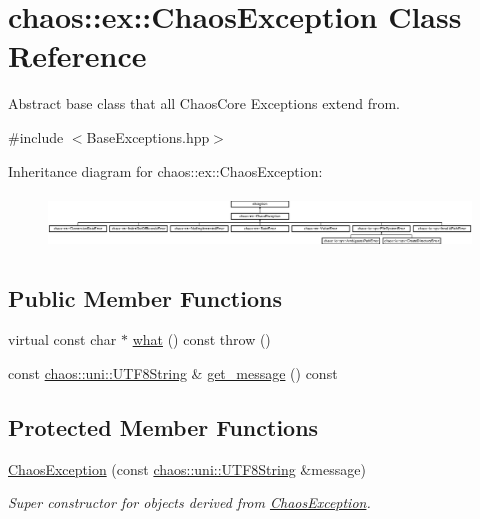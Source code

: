 \hypertarget{classchaos_1_1ex_1_1_chaos_exception}{\section{chaos\-:\-:ex\-:\-:Chaos\-Exception Class Reference}
\label{classchaos_1_1ex_1_1_chaos_exception}
}


Abstract base class that all Chaos\-Core Exceptions extend from.  




{\ttfamily \#include $<$Base\-Exceptions.\-hpp$>$}

Inheritance diagram for chaos\-:\-:ex\-:\-:Chaos\-Exception\-:\begin{figure}[H]
\begin{center}
\leavevmode
\includegraphics[height=1.441442cm]{classchaos_1_1ex_1_1_chaos_exception}
\end{center}
\end{figure}
\subsection*{Public Member Functions}
\begin{DoxyCompactItemize}
\item 
virtual const char $\ast$ \hyperlink{classchaos_1_1ex_1_1_chaos_exception_a5266c5ba1e7b6ab2bbfcb2a6c01fafea}{what} () const   throw ()
\item 
const \hyperlink{classchaos_1_1uni_1_1_u_t_f8_string}{chaos\-::uni\-::\-U\-T\-F8\-String} \& \hyperlink{classchaos_1_1ex_1_1_chaos_exception_a03cf7cf992d411770c7cefa925c84f4f}{get\-\_\-message} () const 
\end{DoxyCompactItemize}
\subsection*{Protected Member Functions}
\begin{DoxyCompactItemize}
\item 
\hyperlink{classchaos_1_1ex_1_1_chaos_exception_a66463bad3b8d75073ae73c27717ae70d}{Chaos\-Exception} (const \hyperlink{classchaos_1_1uni_1_1_u_t_f8_string}{chaos\-::uni\-::\-U\-T\-F8\-String} \&message)
\begin{DoxyCompactList}\small\item\em Super constructor for objects derived from \hyperlink{classchaos_1_1ex_1_1_chaos_exception}{Chaos\-Exception}. \end{DoxyCompactList}\end{DoxyCompactItemize}


